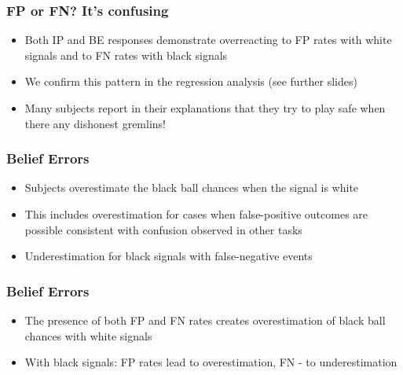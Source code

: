 \documentclass[11pt,hyperref={bookmarks=false}]{beamer}
\begin{document}
\begin{frame}
\frametitle{FP or FN? It's confusing}
\begin{itemize}
\item Both IP and BE responses demonstrate overreacting to FP rates with white signals and to FN rates with black signals
\item We confirm this pattern in the regression analysis (see further slides)
\item Many subjects report in their explanations that they try to play safe when there any dishonest gremlins!
\end{itemize}
\end{frame}



\begin{frame}
\frametitle{Belief Errors}
\begin{itemize}
\item Subjects overestimate the black ball chances when the signal is white
\item This includes overestimation for cases when false-positive outcomes are possible consistent with confusion observed in other tasks
\item Underestimation for black signals with false-negative events 
\end{itemize}
\footnotesize

\end{frame}



\begin{frame}
\frametitle{Belief Errors}
\begin{itemize}
\item The presence of both FP and FN rates creates overestimation of black ball chances with white signals
\item With black signals: FP rates lead to overestimation, FN - to underestimation
\end{itemize}
\footnotesize

\end{frame}
\end{document}
